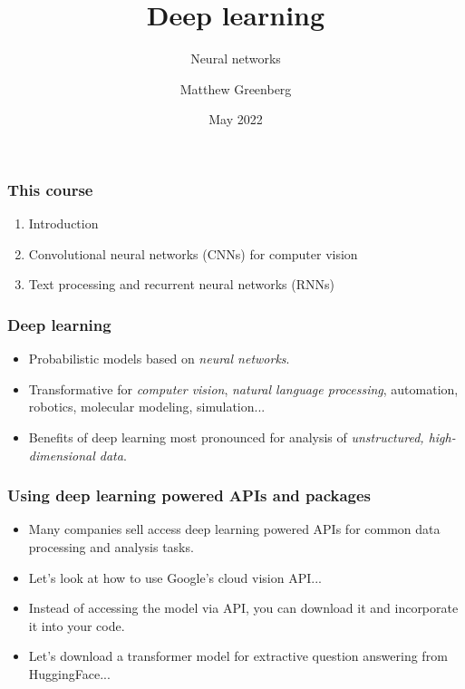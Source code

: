 \documentclass{beamer}
\title{Deep learning}
\subtitle{Neural networks}
\author{Matthew Greenberg}
\date{May 2022}
\begin{document}
    \begin{frame}
    \maketitle
    \end{frame}

    \begin{frame}
        \frametitle{This course}
    
        \begin{enumerate}
            \setlength\itemsep{1em}
            \item Introduction
            
            \item Convolutional neural networks (CNNs) for computer vision
            
            \item Text processing and recurrent neural networks (RNNs)
        \end{enumerate}
    
    \end{frame}

    \begin{frame}
        \frametitle{Deep learning}
        \begin{itemize}
            \item Probabilistic models based on \emph{neural networks}.
            \item Transformative for \emph{computer vision}, \emph{natural language processing}, automation, robotics, molecular modeling, simulation...
            \item Benefits of deep learning most pronounced for analysis of \emph{unstructured, high-dimensional data}.
        \end{itemize}
    \end{frame}

    \begin{frame}
        \frametitle{Using deep learning powered APIs and packages}
    
        \begin{itemize}
            \item Many companies sell access deep learning powered APIs for common data processing and analysis tasks.
            \item Let's look at how to use Google's cloud vision API...
            \item Instead of accessing the model via API, you can download it and incorporate it into your code. 
            \item Let's download a transformer model for extractive question answering from HuggingFace...
        \end{itemize}
    
    \end{frame}
\end{document}
